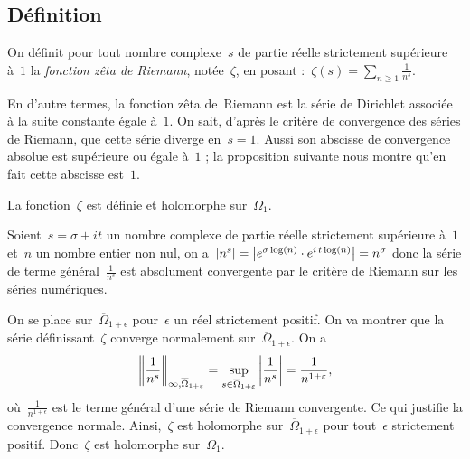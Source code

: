 	\subsection{Définition}
		\begin{defi}
			On définit pour tout nombre complexe~$s$ de partie réelle strictement supérieure à~$1$ la \emph{fonction zêta de Riemann}, notée~$\zeta$, en posant :~$\zeta(s) = \sum_{n\geq 1} \frac{1}{n^s}$.
		\end{defi}
		\begin{rem}
			En d'autre termes, la fonction zêta de~Riemann est la série de Dirichlet associée à la suite constante égale à~$1$. On sait, d'après le critère de convergence des séries de Riemann, que cette série diverge en~$s=1$. Aussi son abscisse de convergence absolue est supérieure ou égale à~$1$ ; la proposition suivante nous montre qu'en fait cette abscisse est~$1$.
		\end{rem}
		\begin{prop}
			La fonction~$\zeta$ est définie et holomorphe sur~$\Omega_1$.
		\end{prop}
		\begin{dem}
			Soient~$s=\sigma+it$ un nombre complexe de partie réelle strictement supérieure à~$1$ et~$n$ un nombre entier non nul, on a~$\left\vert n^s\right\vert= \left\vert e^{\sigma\log(n)}\cdot e^{i\,t\log(n)}\right\vert=n^\sigma$ donc la série de terme général~$\frac{1}{n^s}$ est absolument convergente par le critère de Riemann sur les séries numériques.
			
			On se place sur~$\overline{\Omega}_{1+\epsilon}$ pour~$\epsilon$ un réel strictement positif. On va montrer que la série définissant~$\zeta$ converge normalement sur~$\overline{\Omega}_{1+\epsilon}$. On a
			\[
				\left\Vert \frac{1}{n^s}\right\Vert_{\infty,\overline{\Omega}_{1+\varepsilon}} = \sup_{s\in\overline{\Omega}_{1+\varepsilon}} \left\vert \frac{1}{n^s}\right\vert = \frac{1}{n^{1+\varepsilon}},
			\]
			où~$\frac{1}{n^{1+\epsilon}}$ est le terme général d'une série de Riemann convergente. Ce qui justifie la convergence normale. Ainsi,~$\zeta$ est holomorphe sur~$\overline{\Omega}_{1+\epsilon}$ pour tout~$\epsilon$ strictement positif. Donc~$\zeta$ est holomorphe sur~$\Omega_1$.
		\end{dem}
